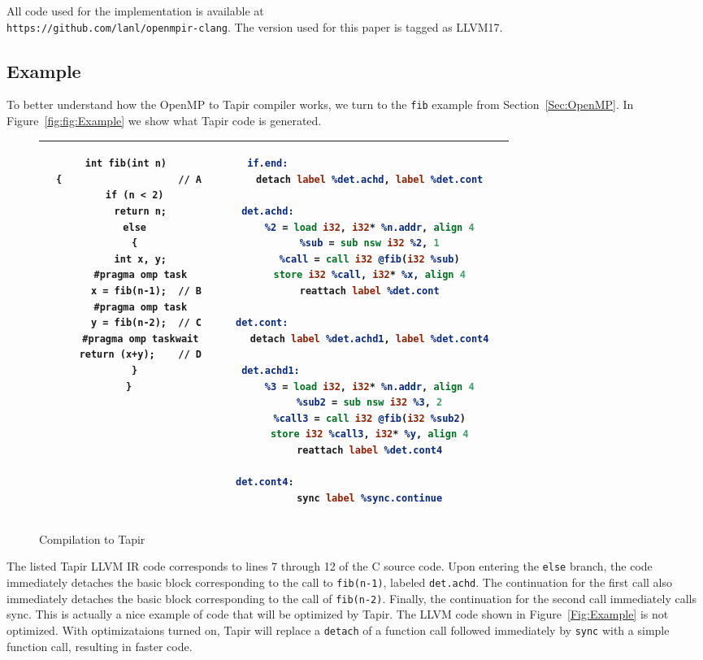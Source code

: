 \documentclass[sigconf]{acmart}
\newcommand{\figref}[1]         {Figure~\ref{fig:#1}}
\begin{document}
All code used for the implementation is available at \\
\texttt{https://github.com/lanl/openmpir-clang}. The version used for this
paper is tagged as LLVM17.

\subsection{Example} \label{Sec:Example}

To better understand how the OpenMP to Tapir compiler works, we turn to the
\texttt{fib} example from Section~\ref{Sec:OpenMP}. In \figref{fig:Example}
we show what Tapir code is generated.  

\begin{figure}
\begin{tabular}{| c c c | c c c |}
\hline
 & 
\begin{lstlisting}
int fib(int n) 
{                    // A
  if (n < 2)
    return n;
  else
  {
    int x, y;
    #pragma omp task
      x = fib(n-1);  // B
    #pragma omp task
      y = fib(n-2);  // C
    #pragma omp taskwait
    return (x+y);    // D
  }
}
\end{lstlisting}
& & &
\begin{lstlisting}[language=llvm]
if.end:                                 
  detach label %det.achd, label %det.cont

det.achd:                                 
  %2 = load i32, i32* %n.addr, align 4
  %sub = sub nsw i32 %2, 1
  %call = call i32 @fib(i32 %sub)
  store i32 %call, i32* %x, align 4
  reattach label %det.cont

det.cont:                                   
  detach label %det.achd1, label %det.cont4

det.achd1:                                
  %3 = load i32, i32* %n.addr, align 4
  %sub2 = sub nsw i32 %3, 2
  %call3 = call i32 @fib(i32 %sub2)
  store i32 %call3, i32* %y, align 4
  reattach label %det.cont4

det.cont4:                                  
  sync label %sync.continue
\end{lstlisting}
 &  \\
\hline
\end{tabular}

\caption{Compilation to Tapir}
\label{fig:Example}
\end{figure}

The listed Tapir LLVM IR code corresponds to lines 7 through 12 of the C source
code.  Upon entering the \texttt{else} branch, the code immediately detaches
the basic block corresponding to the call to \texttt{fib(n-1)}, labeled
\texttt{det.achd}. The continuation for the first call also immediately
detaches the basic block corresponding to the call of \texttt{fib(n-2)}.
Finally, the continuation for the second call immediately calls sync. This is
actually a nice example of code that will be optimized by Tapir. The LLVM code
shown in Figure~\ref{Fig:Example} is not optimized. With optimizataions turned
on, Tapir will replace a \texttt{detach} of a function call followed
immediately by \texttt{sync} with a simple function call, resulting in faster
code. 
\end{document}
